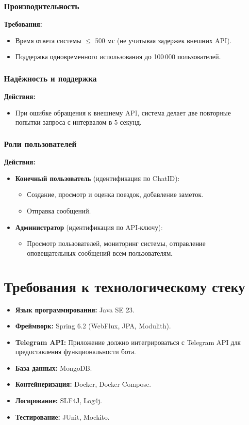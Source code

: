 \documentclass[areasetadvanced]{scrartcl}
\begin{document}
\subsubsection{Производительность}
\textbf{Требования:}
\begin{itemize}
  \item Время ответа системы $\leq$ 500 мс (не учитывая задержек внешних API).
  \item Поддержка одновременного использования до 100\,000 пользователей.
\end{itemize}

\subsubsection{Надёжность и поддержка}
\textbf{Действия:}
\begin{itemize}
  \item При ошибке обращения к внешнему API, система делает две повторные попытки запроса с интервалом в 5 секунд.
\end{itemize}

\subsubsection{Роли пользователей}
\textbf{Действия:}
\begin{itemize}
  \item \textbf{Конечный пользователь} (идентификация по ChatID):
  \begin{itemize}
    \item Создание, просмотр и оценка поездок, добавление заметок.
    \item Отправка сообщений.
  \end{itemize}
  \item \textbf{Администратор} (идентификация по API-ключу):
  \begin{itemize}
    \item Просмотр пользователей, мониторинг системы, отправление оповещательных сообщений всем пользователям.
  \end{itemize}
\end{itemize}

\newpage
\section{Требования к технологическому стеку}
\begin{itemize}
\item \textbf{Язык программирования:} Java SE 23.
\item \textbf{Фреймворк:} Spring 6.2 (WebFlux, JPA, Modulith).
\item \textbf{Telegram API:} Приложение должно интегрироваться с
  Telegram API для предоставления функциональности бота.
\item \textbf{База данных:} MongoDB.
\item \textbf{Контейнеризация:} Docker, Docker Compose.
\item \textbf{Логирование:} SLF4J, Log4j.
\item \textbf{Тестирование:} JUnit, Mockito.
\end{itemize}
\newpage
\end{document}
